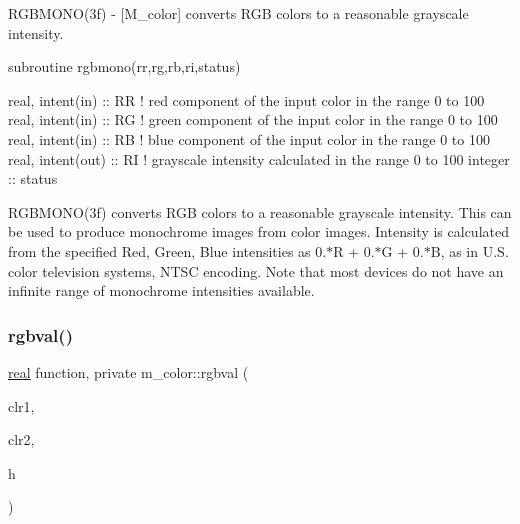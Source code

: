 \begin{DoxyDescription}
\item[\label{_RGBMONO}%
N\+A\+ME ]R\+G\+B\+M\+O\+N\+O(3f) -\/ \mbox{[}M\+\_\+color\mbox{]} converts R\+GB colors to a reasonable grayscale intensity. 


\item[S\+Y\+N\+O\+P\+S\+IS ]
\begin{DoxyPre}
    subroutine rgbmono(rr,rg,rb,ri,status)\end{DoxyPre}



\begin{DoxyPre}     real, intent(in)  :: RR ! red component of the input color in the range 0 to 100
     real, intent(in)  :: RG ! green component of the input color in the range 0 to 100
     real, intent(in)  :: RB ! blue component of the input color in the range 0 to 100
     real, intent(out) :: RI ! grayscale intensity calculated in the range 0 to 100
     integer           :: status
    \end{DoxyPre}





\item[D\+E\+S\+C\+R\+I\+P\+T\+I\+ON ]R\+G\+B\+M\+O\+N\+O(3f) converts R\+GB colors to a reasonable grayscale intensity. This can be used to produce monochrome images from color images. Intensity is calculated from the specified Red, Green, Blue intensities as 0.$\ast$R + 0.$\ast$G + 0.$\ast$B, as in U.\+S. color television systems, N\+T\+SC encoding. Note that most devices do not have an infinite range of monochrome intensities available. 


\end{DoxyDescription}\mbox{\label{namespacem__color_a3e97e24dba7b820f685f13eaa64a6caa}} 
\subsubsection{\texorpdfstring{rgbval()}{rgbval()}}
{\footnotesize\ttfamily \hyperlink{read__watch_83_8txt_abdb62bde002f38ef75f810d3a905a823}{real} function, private m\+\_\+color\+::rgbval (\begin{DoxyParamCaption}\item[{\hyperlink{read__watch_83_8txt_abdb62bde002f38ef75f810d3a905a823}{real}}]{clr1,  }\item[{\hyperlink{read__watch_83_8txt_abdb62bde002f38ef75f810d3a905a823}{real}}]{clr2,  }\item[{\hyperlink{read__watch_83_8txt_abdb62bde002f38ef75f810d3a905a823}{real}}]{h }\end{DoxyParamCaption})\hspace{0.3cm}{\ttfamily [private]}}


